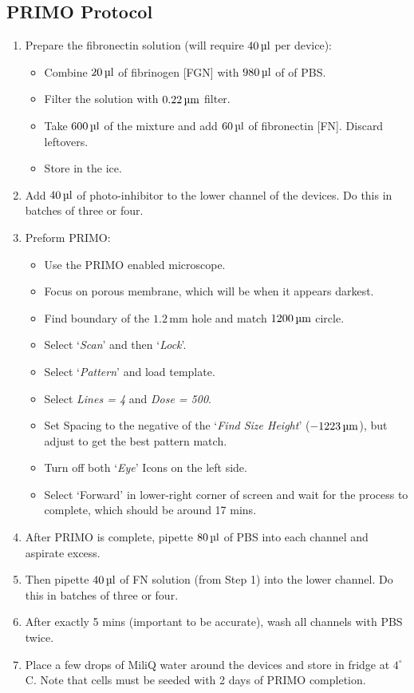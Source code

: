 \subsection{PRIMO Protocol}

\begin{enumerate}
	 \setlength\itemsep{-0.1em}
	\item Prepare the fibronectin solution (will require $40 \, \text{\textmu l}$ per device):
	\begin{itemize}
		 \setlength\itemsep{-0.1em}
		\item Combine $20 \, \text{\textmu l}$ of fibrinogen [FGN] with $980 \, \text{\textmu l}$ of of PBS.
		\item Filter the solution with $0.22 \, \text{\textmu m}$ filter.
		\item Take $600 \, \text{\textmu l}$ of the mixture and add $60 \, \text{\textmu l}$ of fibronectin [FN]. Discard leftovers.
		\item Store in the ice.
	\end{itemize}
	\item Add $40 \, \text{\textmu l}$ of photo-inhibitor to the lower channel of the devices. Do this in batches of three or four.
	\item Preform PRIMO:
	\begin{itemize}
		 \setlength\itemsep{-0.1em}
		\item Use the PRIMO enabled microscope.
		\item Focus on porous membrane, which will be when it appears darkest.
		\item Find boundary of the $1.2 \, \text{mm}$ hole and match $1200 \, \text{\textmu m}$ circle.
		\item Select `\textit{Scan}' and then `\textit{Lock}'.
		\item Select `\textit{\textmu Pattern}' and load template.
		\item Select \textit{Lines = 4} and \textit{Dose = 500}.
		\item Set Spacing to the negative of the `\textit{Find Size Height}' ($-1223 \, \text{\textmu m}$), but adjust to get the best pattern match.
		\item Turn off both `\textit{Eye}' Icons on the left side.
		\item Select `Forward' in lower-right corner of screen and wait for the process to complete, which should be around 17 mins.
	\end{itemize}
	\item After PRIMO is complete, pipette $80 \, \text{\textmu l}$ of PBS into each channel and aspirate excess.
	\item Then pipette $40 \, \text{\textmu l}$ of FN solution (from Step 1) into the lower channel. Do this in batches of three or four.
	\item After exactly 5 mins (important to be accurate), wash all channels with PBS twice.
	\item Place a few drops of MiliQ water around the devices and store in fridge at $4^{\circ}$C. Note that cells must be seeded with 2 days of PRIMO completion. 
\end{enumerate}

